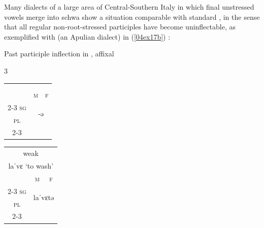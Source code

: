 \documentclass[output=paper,colorlinks,citecolor=brown]{langscibook}
\begin{document}
Many dialects of a large area of Central-Southern Italy in which final unstressed vowels merge into schwa show a situation comparable with standard , in the sense that all regular non-root-stressed participles have become uninflectable, as exemplified with  (an Apulian dialect) in (\ref{04ex17b}) \citep[66]{loporcaro1998}:

\bigskip

\noindent\begin{minipage}{\textwidth}
	\begin{exe}
		\ex \label{04ex17}
		Past participle inflection in , affixal
		
		\hspace*{-3em}
		\begin{minipage}{\dimexpr\textwidth}
			\setlength{\columnsep}{-15pt}
			\begin{multicols}{3}
				\begin{xlist}
					\ex \label{04ex17a}
					\begin{tabularx}{\linewidth}{ccc}
						\multicolumn{3}{c}{\phantom{text}} \\
						\multicolumn{3}{c}{\phantom{texttext}} \\
						& \textsc{m} & \textsc{f} \\
						\cline{2-3}
						\textsc{sg} & \multicolumn{2}{|c|}{\multirow{2}{*}{-ə}} \\
						\textsc{pl} & \multicolumn{2}{|c|}{\phantom{x}} \\
						\cline{2-3}
					\end{tabularx}
					
					\ex \label{04ex17b}
					\begin{tabularx}{\linewidth}{ccc}
						\multicolumn{3}{c}{weak} \\
						\multicolumn{3}{c}{laˈvɛ ‘to wash’} \\
						& \textsc{m} & \textsc{f} \\
						\cline{2-3}
						\textsc{sg} & \multicolumn{2}{|c|}{\multirow{2}{*}{laˈvɛtə}} \\
						\textsc{pl} & \multicolumn{2}{|c|}{\phantom{x}} \\
						\cline{2-3}
					\end{tabularx}
					

\end{xlist}
\end{multicols}
\end{minipage}
\end{exe}
\end{minipage}
\end{document}
